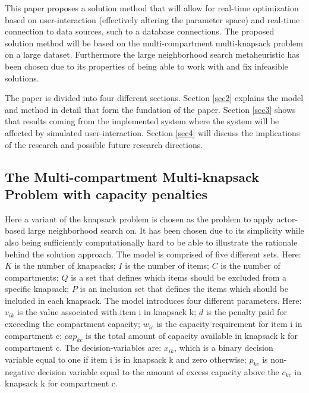 \documentclass[preprint,12pt,authoryear]{elsarticle}
\begin{document}
This paper proposes a solution method that will allow for real-time optimization based on user-interaction (effectively altering the parameter space) and real-time 
connection to data sources, such to a database connections. The proposed solution method will be based on the multi-compartment multi-knapsack problem on a large dataset. 
Furthermore the large neighborhood search metaheuristic has been chosen due to its properties of being able to work with and fix infeasible solutions. 

The paper is divided into four different sections. Section \ref{sec2} explains the model and method in detail that form the fundation of the paper. 
Section \ref{sec3} shows that results coming from the implemented system where the system will be affected by simulated user-interaction. Section \ref{sec4} 
will discuss the implications of the research and possible future research directions.




\subsection{The Multi-compartment Multi-knapsack Problem with capacity penalties}
\label{sub1sec2}
Here a variant of the knapsack problem is chosen as the problem to apply actor-based large neighborhood search on. It has been chosen due to its simplicity
while also being sufficiently computationally hard to be able to illustrate the rationale behind the solution approach. The model is comprised of 
five different sets. Here: $K$ is the number of knapsacks; $I$ is the number of items; $C$ is the number of compartments; $Q$ is a set that
defines which items should be excluded from a specific knapsack; $P$ is an inclusion set that defines the items which should be included in each 
knapsack. The model introduces four different parameters. Here: $v_{ik}$ is the value associated with item i in knapsack k; $d$ is the 
penalty paid for exceeding the compartment capacity; $w_{ic}$ is the capacity requirement for item i in compartment c; $cap_{kc}$ is the total amount 
of capacity available in knapsack k for compartment c. The decision-variables are: $x_{ik}$, which is a binary decision variable equal to one 
if item i is in knapsack k and zero otherwise; $p_{kc}$ is non-negative decision variable equal to the amount of excess capacity above 
the $c_{kc}$ in knapsack k for compartment c. 
\end{document}

